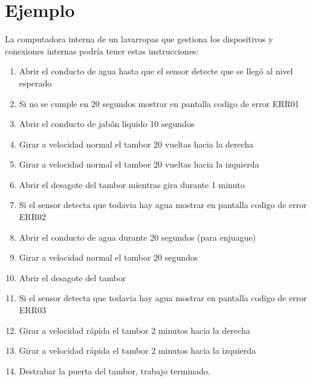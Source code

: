 \documentclass[a4paper,12pt,spanish]{sphinxmanual}
\begin{document}
\section{Ejemplo}
\label{\detokenize{que:ejemplo}}
\sphinxAtStartPar
La computadora interna de un lavarropas que gestiona los dispositivos y conexiones internas podría tener estas instrucciones:
\begin{enumerate}
%
\item {} 
\sphinxAtStartPar
Abrir el conducto de agua hasta que el sensor detecte que se llegó al nivel esperado

\item {} 
\sphinxAtStartPar
\textendash{} Si no se cumple en 20 segundos mostrar en pantalla codigo de error ERR01

\item {} 
\sphinxAtStartPar
Abrir el conducto de jabón líquido 10 segundos

\item {} 
\sphinxAtStartPar
Girar a velocidad normal el tambor 20 vueltas hacia la derecha

\item {} 
\sphinxAtStartPar
Girar a velocidad normal el tambor 20 vueltas hacia la izquierda

\item {} 
\sphinxAtStartPar
Abrir el desagote del tambor mientras gira durante 1 minuto

\item {} 
\sphinxAtStartPar
\textendash{} Si el sensor detecta que todavia hay agua mostrar en pantalla codigo de error ERR02

\item {} 
\sphinxAtStartPar
Abrir el conducto de agua durante 20 segundos (para enjuague)

\item {} 
\sphinxAtStartPar
Girar a velocidad normal el tambor 20 segundos

\item {} 
\sphinxAtStartPar
Abrir el desagote del tambor

\item {} 
\sphinxAtStartPar
\textendash{} Si el sensor detecta que todavia hay agua mostrar en pantalla codigo de error ERR03

\item {} 
\sphinxAtStartPar
Girar a velocidad rápida el tambor 2 minutos hacia la derecha

\item {} 
\sphinxAtStartPar
Girar a velocidad rápida el tambor 2 minutos hacia la izquierda

\item {} 
\sphinxAtStartPar
Destrabar la puerta del tambor, trabajo terminado.

\end{enumerate}
\end{document}
